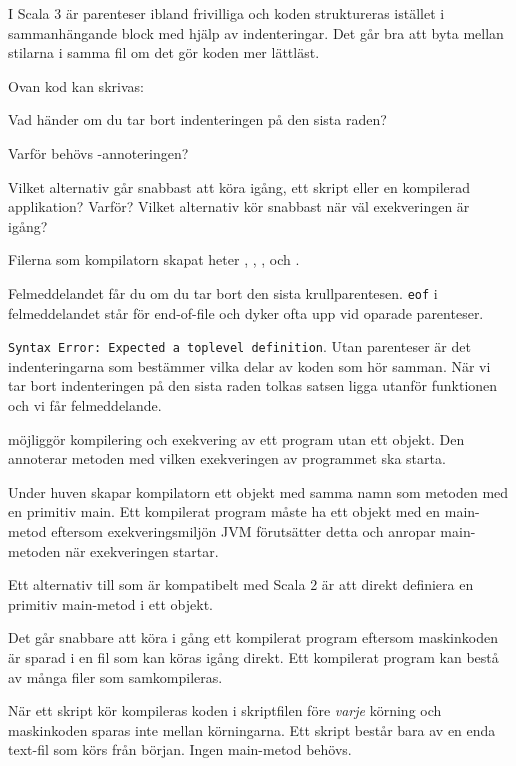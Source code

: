 \Subtask I Scala 3 är parenteser ibland frivilliga och koden struktureras istället i sammanhängande block med hjälp av indenteringar. Det går bra att byta mellan stilarna i samma fil om det gör koden mer lättläst.

Ovan kod kan skrivas:

Vad händer om du tar bort indenteringen på den sista raden?

\Subtask Varför behövs -annoteringen?

\Subtask Vilket alternativ går snabbast att köra igång, ett skript eller en kompilerad applikation? Varför? Vilket alternativ kör snabbast när väl exekveringen är igång?


\SOLUTION


\TaskSolved \what


\SubtaskSolved  Filerna som kompilatorn skapat heter , , ,  och .

\SubtaskSolved  Felmeddelandet får du om du tar bort den sista krullparentesen. \texttt{eof} i felmeddelandet står för end-of-file och dyker ofta upp vid oparade parenteser.

\SubtaskSolved  \texttt{Syntax Error: Expected a toplevel definition}. Utan parenteser är det indenteringarna som bestämmer vilka delar av koden som hör samman. När vi tar bort indenteringen på den sista raden tolkas satsen ligga utanför funktionen och vi får felmeddelande.

\SubtaskSolved {} möjliggör kompilering och exekvering av ett program utan ett objekt. Den annoterar metoden med vilken exekveringen av programmet ska starta.

Under huven skapar kompilatorn ett objekt med samma namn som metoden med
en primitiv main. Ett kompilerat program måste ha ett objekt med en main-metod
eftersom exekveringsmiljön JVM förutsätter detta och anropar main-metoden när
exekveringen startar.

Ett alternativ till  som är kompatibelt med Scala 2 är att direkt definiera en primitiv main-metod i ett objekt.

\SubtaskSolved
  Det går snabbare att köra i gång ett kompilerat program eftersom maskinkoden är sparad i en fil som kan köras igång direkt.  Ett kompilerat program kan bestå av många filer som samkompileras.

  När ett skript kör kompileras koden i skriptfilen före \emph{varje} körning och maskinkoden sparas inte mellan körningarna. Ett skript består bara av en enda text-fil som körs från början. Ingen main-metod behövs.

